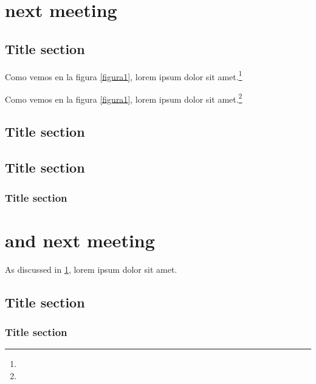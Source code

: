 \documentclass{book}
\begin{document}
\chapter{next meeting}
\label{mychapter2}

\section{Title section}

\lipsum[1]

\lipsum[1]

Como vemos en la figura \ref{figura1}, lorem ipsum dolor sit amet.\footnote{\lipsum[1]}

\lipsum[1]

\lipsum[1]

Como vemos en la figura \ref{figura1}, lorem ipsum dolor sit amet.\footnote{\lipsum[1]}

\lipsum[1]

\lipsum[2]

\section{Title section}

\lipsum[3]

\section{Title section}

\lipsum[1]

\subsection{Title section}

\lipsum[1]

\chapter{and next meeting}
As discussed in \ref{mychapter2}, lorem ipsum dolor sit amet.

\lipsum[2]

\section{Title section}

\lipsum[3]

\subsection{Title section}
\end{document}
